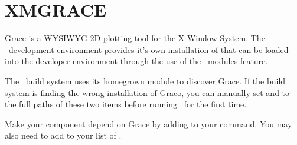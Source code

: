 \section{XMGRACE}
\label{appsec:grace}

Grace is a WYSIWYG 2D plotting tool for the X Window System.  The \draco\ development environment provides it's own installation of  that can be loaded into the developer environment through the use of the \draco\ modules feature.

The \draco\ build system uses its homegrown  module to discover Grace.  If the build system is finding the wrong installation of Graco, you can manually set  and  to the full paths of these two items before running \cmake\ for the first time.

Make your component depend on Grace by adding  to your  command.  You may also need to add  to your list of .


%
%
%
%
%
